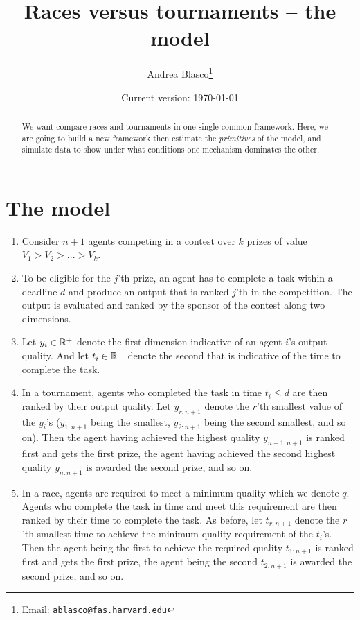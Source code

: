 \documentclass[11pt]{article}
\title{%
Races versus tournaments -- the model}
\date{%
Current version: \today}
\author{%
Andrea Blasco\thanks{%
  Email: \texttt{ablasco@fas.harvard.edu}}
}
\begin{document}
\maketitle
\begin{abstract}
We want compare races and tournaments in one single common framework. Here, we are going to build a new framework then estimate the \emph{primitives} of the model, and simulate data to show under what conditions one mechanism dominates the other.
\end{abstract}

\section{The model}
\begin{enumerate}[label=>>]

\item Consider $n+1$ agents competing in a contest over $k$ prizes of value $V_1 > V_2 > ... > V_k$.

\item To be eligible for the $j$'th prize, an agent has to complete a task within a deadline $d$ and produce an output that is ranked $j$'th in the competition. The output is evaluated and ranked by the sponsor of the contest along two dimensions. 

\item Let $y_i\in\mathbb{R}^{+}$ denote the first dimension indicative of an agent $i$'s output quality. And let $t_i\in\mathbb{R}^{+}$ denote the second that is indicative of the time to complete the task. 

\item In a tournament, agents who completed the task in time $t_i\leq d$ are then ranked by their output quality. Let $y_{r:n+1}$ denote the $r$'th smallest value of the $y_i$'s ($y_{1:n+1}$ being the smallest, $y_{2:n+1}$ being the second smallest, and so on). Then the agent having achieved the highest quality $y_{n+1:n+1}$ is ranked first and gets the first prize, the agent having achieved the second highest quality $y_{n:n+1}$ is awarded the second prize, and so on.

\item In a race, agents are required to meet a minimum quality which we denote $q$. Agents who complete the task in time and meet this requirement are then ranked by their time to complete the task. As before, let $t_{r:n+1}$ denote the $r$'th smallest time to achieve the minimum quality requirement of the $t_i$'s.  Then the agent being the first to achieve the required quality $t_{1:n+1}$ is ranked first and gets the first prize, the agent being the second $t_{2:n+1}$ is awarded the second prize, and so on. 



\end{enumerate}
\end{document}
